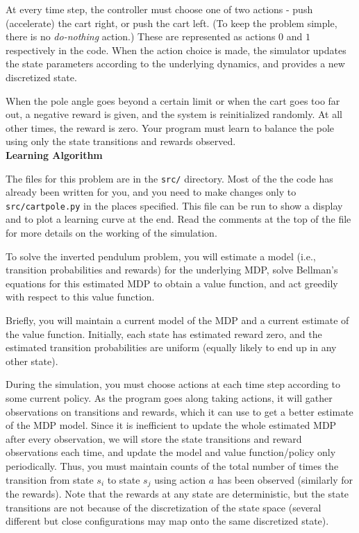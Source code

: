 At every time step, the controller must choose one of two actions -
push (accelerate) the cart right, or push the cart left.
(To keep the problem simple, there is no {\it do-nothing} action.)
These are represented as actions $0$ and $1$ respectively in the code.  
When the action choice is made, the simulator updates the state parameters 
according to the underlying dynamics, and provides a new discretized state.

When the pole angle goes beyond a certain limit or when the cart goes
too far out, a negative reward is given, and the system is reinitialized 
randomly. At all other times, the reward is zero.  Your program must learn 
to balance the pole using only the state transitions and rewards observed.\\

\textbf{Learning Algorithm}

The files for this problem are in the {\tt src/} directory.
Most of the the code has already been written for you, and you need 
to make changes only to {\tt src/cartpole.py} in the places specified. This 
file can be run to show a display and to plot a learning curve 
at the end.  Read the comments at the top of the file for more details
on the working of the simulation.

To solve the inverted pendulum problem, you will estimate a 
model (i.e., transition probabilities and rewards) for the underlying 
MDP, solve Bellman's equations for this estimated MDP to obtain
a value function, and act greedily with respect to this value function.  

Briefly, you will maintain a current model of the MDP and a current
estimate of the value function. Initially, each state has estimated reward zero,
and the estimated transition probabilities are uniform (equally likely 
to end up in any other state).

During the simulation, you must choose actions at each time step 
according to some current policy.  As the program goes along taking 
actions, it will gather observations on transitions and rewards,
which it can use to get a better estimate of the MDP model.
Since it is inefficient to update the whole estimated MDP after every 
observation, we will store the state transitions and reward observations 
each time, and update the model and value function/policy only periodically. 
Thus, you must maintain counts of the total number of times the 
transition from state $s_i$ to state $s_j$ using action $a$ has been 
observed (similarly for the rewards).  Note that the rewards at 
any state are deterministic, but the state transitions are not because 
of the discretization of the state space (several different but close
configurations may map onto the same discretized state).

